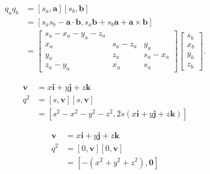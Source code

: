 \begin{tcolorbox}[breakable, enhanced,title = {乘积}]
    $$
        \begin{aligned}
            q_{a} q_{b} & =\left[s_{a}, \mathbf{a}\right]\left[s_{b}, \mathbf{b}\right]                                                         \\
                        & =\left[s_{a} s_{b}-\mathbf{a} \cdot \mathbf{b}, s_{a} \mathbf{b}+s_{b} \mathbf{a}+\mathbf{a} \times \mathbf{b}\right] \\
                        & =\left[\begin{array}{rrr}
                    s_{a}-x_{a}-y_{a}-z_{a}                 \\
                    x_{a}       & s_{a}-z_{a} & y_{a}       \\
                    y_{a}       & z_{a}       & s_{a}-x_{a} \\
                    z_{a}-y_{a} & x_{a}       & s_{a}
                \end{array}\right]\left[\begin{array}{c}
                    s_{b} \\
                    x_{b} \\
                    y_{b} \\
                    z_{b}
                \end{array}\right] .
        \end{aligned}
    $$
\end{tcolorbox}

\begin{tcolorbox}[breakable, enhanced,title = {平方}]
    $$
        \begin{aligned}
            \mathbf{v} & =x \mathbf{i}+y \mathbf{j}+z \mathbf{k}                                            \\
            q^{2}      & =[s, \mathbf{v}][s, \mathbf{v}]                                                    \\
                       & =\left[s^{2}-x^{2}-y^{2}-z^{2}, 2 s(x \mathbf{i}+y \mathbf{j}+z \mathbf{k})\right]
        \end{aligned}
    $$
\end{tcolorbox}

\begin{tcolorbox}[breakable, enhanced,title = {纯四元数}]
    $$
        \begin{aligned}
            \mathbf{v} & =x \mathbf{i}+y \mathbf{j}+z \mathbf{k}                   \\
            q^{2}      & =[0, \mathbf{v}][0, \mathbf{v}]                           \\
                       & =\left[-\left(x^{2}+y^{2}+z^{2}\right), \mathbf{0}\right]
        \end{aligned}
    $$
\end{tcolorbox}

